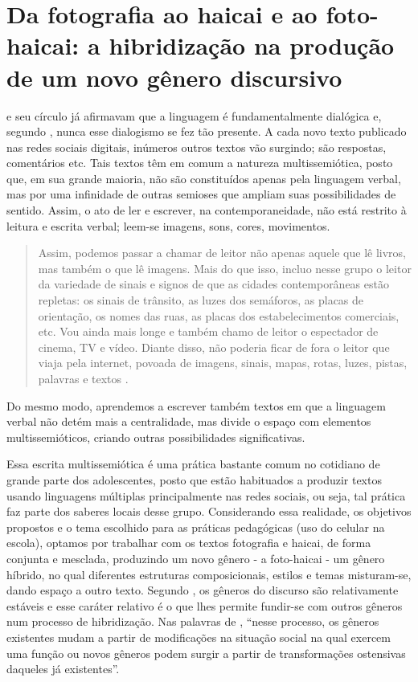 \documentclass{textolivre}
\begin{document}
\section{Da fotografia ao haicai e ao foto-haicai: a hibridização na produção de um novo gênero discursivo}\label{sec-fotografia}
\textcite{bakhtin2006} e seu círculo já afirmavam que a linguagem é fundamentalmente dialógica e, segundo \textcite{santaella2012}, nunca esse dialogismo se fez tão presente. A cada novo texto publicado nas redes sociais digitais, inúmeros outros textos vão surgindo; são respostas, comentários etc. Tais textos têm em comum a natureza multissemiótica, posto que, em sua grande maioria, não são constituídos apenas pela linguagem verbal, mas por uma infinidade de outras semioses que ampliam suas possibilidades de sentido. Assim, o ato de ler e escrever, na contemporaneidade, não está restrito à leitura e escrita verbal; leem-se imagens, sons, cores, movimentos.

\begin{quote}
Assim, podemos passar a chamar de leitor não apenas aquele que lê livros, mas também o que lê imagens. Mais do que isso, incluo nesse grupo o leitor da variedade de sinais e signos de que as cidades contemporâneas estão repletas: os sinais de trânsito, as luzes dos semáforos, as placas de orientação, os nomes das ruas, as placas dos estabelecimentos comerciais, etc. Vou ainda mais longe e também chamo de leitor o espectador de cinema, TV e vídeo. Diante disso, não poderia ficar de fora o leitor que viaja pela internet, povoada de imagens, sinais, mapas, rotas, luzes, pistas, palavras e textos \cite[p. 7]{santaella2012}.
\end{quote}

Do mesmo modo, aprendemos a escrever também textos em que a linguagem verbal não detém mais a centralidade, mas divide o espaço com elementos multissemióticos, criando outras possibilidades significativas.

Essa escrita multissemiótica é uma prática bastante comum no cotidiano de grande parte dos adolescentes, posto que estão habituados a produzir textos usando linguagens múltiplas principalmente nas redes sociais, ou seja, tal prática faz parte dos saberes locais desse grupo. Considerando essa realidade, os objetivos propostos e o tema escolhido para as práticas pedagógicas (uso do celular na escola), optamos por trabalhar com os textos fotografia e haicai, de forma conjunta e mesclada, produzindo um novo gênero - a foto-haicai - um gênero híbrido, no qual diferentes estruturas composicionais, estilos e temas misturam-se, dando espaço a outro texto. Segundo \textcite{bakhtin1997}, os gêneros do discurso são relativamente estáveis e esse caráter relativo é o que lhes permite fundir-se com outros gêneros num processo de hibridização. Nas palavras de \textcite[p. 87]{pagano2001}, “nesse processo, os gêneros existentes mudam a partir de modificações na situação social na qual exercem uma função ou novos gêneros podem surgir a partir de transformações ostensivas daqueles já existentes”.
\end{document}
